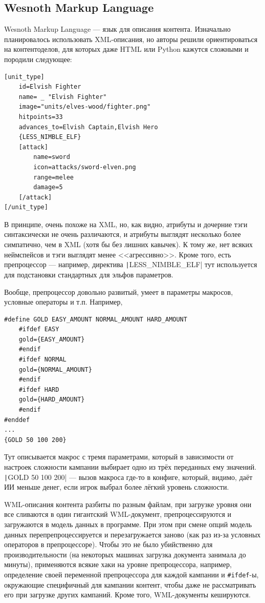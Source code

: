 \documentclass[a5paper]{article}
\begin{document}
\subsection{Wesnoth Markup Language}

Wesnoth Markup Language --- язык для описания контента. Изначально планировалось использовать XML-описания, но авторы решили ориентироваться на контентоделов, для которых даже HTML или Python кажутся сложными и породили следующее:

\begin{verbatim}
[unit_type]
    id=Elvish Fighter
    name= _ "Elvish Fighter"
    image="units/elves-wood/fighter.png"
    hitpoints=33
    advances_to=Elvish Captain,Elvish Hero
    {LESS_NIMBLE_ELF}
    [attack]
        name=sword
        icon=attacks/sword-elven.png
        range=melee
        damage=5
    [/attack]
[/unit_type]
\end{verbatim}

В принципе, очень похоже на XML, но, как видно, атрибуты и дочерние тэги синтаксически не очень различаются, и атрибуты выглядят несколько более симпатично, чем в XML (хотя бы без лишних кавычек). К тому же, нет всяких неймспейсов и тэги выглядят менее <<агрессивно>>. Кроме того, есть препроцессор --- например, директива \texttt|{LESS_NIMBLE_ELF}| тут используется для подстановки стандартных для эльфов параметров.

Вообще, препроцессор довольно развитый, умеет в параметры макросов, условные операторы и т.п. Например,

\begin{verbatim}
#define GOLD EASY_AMOUNT NORMAL_AMOUNT HARD_AMOUNT
    #ifdef EASY
    gold={EASY_AMOUNT}
    #endif
    #ifdef NORMAL
    gold={NORMAL_AMOUNT}
    #endif
    #ifdef HARD
    gold={HARD_AMOUNT}
    #endif
#enddef
...
{GOLD 50 100 200}
\end{verbatim}

Тут описывается макрос с тремя параметрами, который в зависимости от настроек сложности кампании выбирает одно из трёх переданных ему значений. \texttt|{GOLD 50 100 200}| --- вызов макроса где-то в конфиге, который, видимо, даёт ИИ меньше денег, если игрок выбрал более лёгкий уровень сложности.

WML-описания контента разбиты по разным файлам, при загрузке уровня они все сливаются в один гигантский WML-документ, препроцессируются и загружаются в модель данных в программе. При этом при смене опций модель данных перепрепроцессируется и перезагружается заново (как раз из-за условных операторов в препроцессоре). Чтобы это не было убийственно для производительности (на некоторых машинах загрузка документа занимала до минуты), применяются всякие хаки на уровне препроцессора, например, определение своей переменной препроцессора для каждой кампании и \texttt{#ifdef}-ы, окружающие специфичный для кампании контент, чтобы даже не рассматривать его при загрузке других кампаний. Кроме того, WML-документы кешируются.
\end{document}
